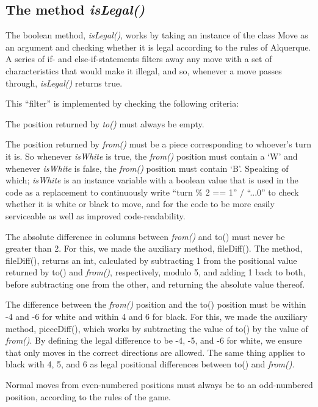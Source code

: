 \documentclass[12pt, a4paper]{article}
\begin{document}
\subsection{The method \emph{isLegal()}}
The boolean method, \emph{isLegal()}, works by taking an instance of the class Move as an argument and checking whether it is legal according to the rules of Alquerque. A series of if- and else-if-statements filters away any move with a set of characteristics that would make it illegal, and so, whenever a move passes through, \emph{isLegal()} returns true. \par 
This “filter” is implemented by checking the following criteria: \par
The position returned by \emph{to()} must always be empty. \par 
The position returned by \emph{from()} must be a piece corresponding to whoever's turn it is. So whenever \emph{isWhite} is true, the \emph{from()} position must contain a ‘W’ and whenever \emph{isWhite} is false, the \emph{from()} position must contain ‘B’. Speaking of which; \emph{isWhite} is an instance variable with a boolean value that is used in the code as a replacement to continuously write “turn \% 2 == 1” / “...0”  to check whether it is white or black to move, and for the code to be more easily serviceable as well as improved code-readability. \par
The absolute difference in columns between \emph{from()} and to() must never be greater than 2. For this, we made the auxiliary method, fileDiff(). The method, fileDiff(), returns an int, calculated by subtracting 1 from the positional value returned by to() and \emph{from()}, respectively, modulo 5, and adding 1 back to both, before subtracting one from the other, and returning the absolute value thereof. \par 
The difference between the \emph{from()} position and the to() position must be within -4 and -6 for white and within 4 and 6 for black. For this, we made the auxiliary method, pieceDiff(), which works by subtracting the value of to() by the value of \emph{from()}. By defining the legal difference to be -4, -5, and -6 for white, we ensure that only moves in the correct directions are allowed. The same thing applies to black with 4, 5, and 6 as legal positional differences between to() and \emph{from()}. \par
Normal moves from even-numbered positions must always be to an odd-numbered position, according to the rules of the game. \par
\end{document}
